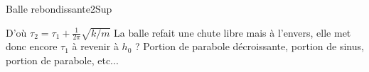 \begin{exercise}{Balle rebondissante}{2}{Sup}
\begin{solution}
\begin{questions}
    
    D'où $\tau_2 = \tau_1 + \frac{1}{2\pi}\sqrt{k/m}$
    \question La balle refait une chute libre mais à l'envers, elle met donc encore $\tau_1$ à revenir à $h_0$ ?
    \question Portion de parabole décroissante, portion de sinus, portion de parabole, etc...
\end{questions}
\end{solution}

\end{exercise}
